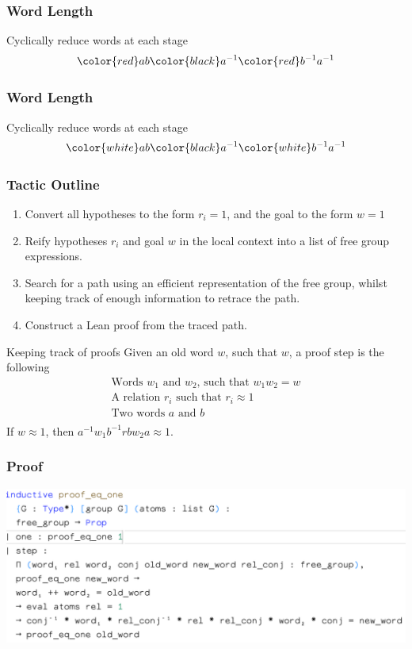 \documentclass{beamer}
\begin{document}
\begin{frame}
  \frametitle{Word Length}
  Cyclically reduce words at each stage
  \begin{equation*}
    \color{red}ab\color{black}a^{-1}\color{red}b^{-1}a^{-1}
  \end{equation*}
\end{frame}

\begin{frame}
  \frametitle{Word Length}
  Cyclically reduce words at each stage
  \begin{equation*}
    \color{white}ab\color{black}a^{-1}\color{white}b^{-1}a^{-1}
  \end{equation*}
\end{frame}


\begin{frame}
  \frametitle{Tactic Outline}
  \begin{enumerate}
    \item Convert all hypotheses to the form $r_i = 1$, and the goal to the form $w = 1$
    \item Reify hypotheses $r_i$ and goal $w$ in the local context
      into a list of free group expressions.
    \item Search for a path using an efficient representation of the free group,
       whilst keeping track of enough information to retrace the path.
    \item Construct a Lean proof from the traced path.
  \end{enumerate}
\end{frame}

\begin{frame}{Keeping track of proofs}
  Given an old word $w$, such that $w$, a proof step is the following
  \begin{equation*}
    \begin{aligned}
      \text{Words } w_1 \text{ and } w_2 \text{, such that } w_1w_2 = w \\
      \text{A relation } r_i\text{ such that }r_i \approx 1 \\
      \text{Two words } a \text{ and } b \\
    \end{aligned}
  \end{equation*}
  If $w \approx 1$, then $a^{-1}w_1b^{-1}rbw_2a \approx 1$.
\end{frame}

\begin{frame}
  \frametitle{Proof}
  \includegraphics[width=\linewidth]{Screenshot.png}
\end{frame}
\end{document}
